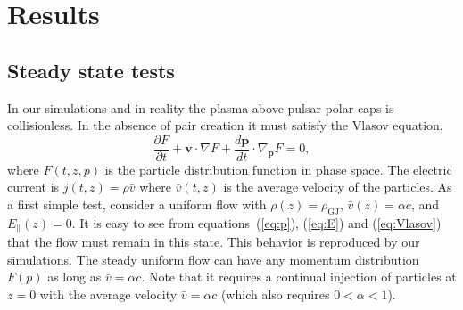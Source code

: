 
\section{Results}
\label{sec:pc-results}

\subsection{Steady state tests}


In our simulations and in reality the plasma above pulsar polar caps is collisionless.
In the absence of pair creation it must satisfy
the Vlasov equation,
\begin{equation}
\label{eq:Vlasov}
    \frac{\partial F}{\partial t} + \mathbf{v}\cdot \nabla F + \frac{d\mathbf{p}}{dt}\cdot \nabla_\mathbf{p} F = 0,
\end{equation}
where $F(t,z,p)$ is the particle distribution function in phase space. The
electric current is $j(t,z)=\rho \bar{v}$ where $\bar{v}(t,z)$  is the average
velocity of the particles. As a first simple test, consider a uniform flow
with $\rho(z)=\rho_\mathrm{GJ}$, $\bar{v}(z)=\alpha c$, and $E_\parallel(z)=0$.
It is easy to see from equations~(\ref{eq:p}), (\ref{eq:E}) and (\ref{eq:Vlasov}) that
the flow must remain in this state. This behavior is reproduced by our simulations.
The steady uniform flow can have any momentum distribution $F(p)$
as long as $\bar{v}=\alpha c$. Note that it requires a continual injection of particles
at $z=0$ with the average velocity $\bar{v}=\alpha c$ (which also requires $0<\alpha<1$).

